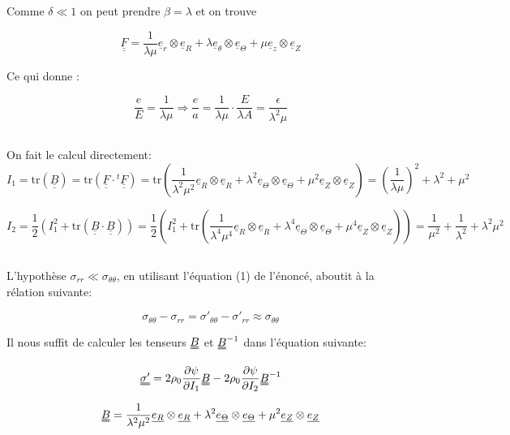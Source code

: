 \documentclass[a4paper,11pt]{article}
\newcommand{\tens}{\uuline}
\newcommand{\diage}[1]{\uline{e_{#1}} \otimes \uline{e_{#1}}}
\begin{document}
Comme $\delta \ll 1$ on peut prendre $\beta=\lambda$ et on trouve

$$\underline{\underline{F}} = \frac{1}{\lambda\mu}\underline{e}_r\otimes\underline{e}_R+\lambda\underline{e}_\theta\otimes\underline{e}_\Theta+\mu\underline{e}_z\otimes\underline{e}_Z $$

Ce qui donne :

$$ \frac{e}{E} = \frac{1}{\lambda\mu} \Longrightarrow \frac{e}{a} = \frac{1}{\lambda\mu} \cdot \frac{E}{\lambda A} = \frac{ \epsilon}{\lambda^2 \mu}$$

\subsection{}
On fait le calcul directement: $$I_1=\text{tr}\left(\underline{\underline{B}}\right) = \text{tr}\left(\underline{\underline{F}}\cdot{}^{t}\underline{\underline{F}}\right) = \text{tr}\left(\frac{1}{\lambda^2\mu^2}\underline{e}_R\otimes\underline{e}_R + \lambda^2\underline{e}_\Theta\otimes\underline{e}_\Theta + \mu^2\underline{e}_Z\otimes\underline{e}_Z \right)=\left(\frac{1}{\lambda\mu}\right)^2+\lambda^2+\mu^2$$

	$$I_2 = \frac{1}{2}\left(I_1^2+\text{tr}\left(\underline{\underline{B}}\cdot\underline{\underline{B}}\right)\right) = \frac{1}{2}\left(I_1^2+\text{tr}\left( \frac{1}{\lambda^4\mu^4}\underline{e}_R\otimes\underline{e}_R + \lambda^4\underline{e}_\Theta\otimes\underline{e}_\Theta + \mu^4\underline{e}_Z\otimes\underline{e}_Z \right)\right)  = \frac{1}{\mu^2}+\frac{1}{\lambda^2}+\lambda^2\mu^2$$


\subsection{}

L'hypothèse $\sigma_{rr} \ll \sigma_{\theta\theta}$, en utilisant l'équation (1) de l'énoncé, aboutit à la rélation suivante:

$$\sigma_{\theta\theta} - \sigma_{rr} = \sigma'_{\theta\theta} - \sigma'_{rr} \approx \sigma_{\theta\theta}$$

Il nous suffit de calculer les tenseurs $\tens{B}$ et $\tens{B}^{-1}$ dans l'équation suivante:

$$ \tens{\sigma'} = 2 \rho_0 \frac{\partial\psi}{\partial I_1} \tens {B} - 2 \rho_0 \frac{\partial\psi}{\partial I_2} \tens {B}^{-1}$$

$$ \tens{B} = \frac{1}{\lambda^2\mu^2} \diage{R} + \lambda^2 \diage{\Theta} + \mu^2 \diage{Z} $$
\end{document}
